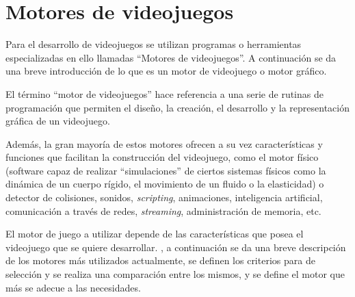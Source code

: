 \section{Motores de videojuegos}



Para el desarrollo de videojuegos se utilizan programas o herramientas
especializadas en ello llamadas \enquote{Motores de videojuegos}. A continuación
se da una breve introducción de lo que es un motor de videojuego o motor
gráfico.

El término \enquote{motor de videojuegos} hace referencia a una serie de rutinas
de programación que permiten el diseño, la creación, el desarrollo y la
representación gráfica de un videojuego\cite{videojuego:telechea}.

Además, la gran mayoría de estos motores ofrecen a su vez características y
funciones que facilitan la construcción del videojuego, como el motor físico
(software capaz de realizar \enquote{simulaciones} de ciertos sistemas físicos
como la dinámica de un cuerpo rígido, el movimiento de un fluido o la
elasticidad) o detector de colisiones, sonidos, \textit{scripting}, animaciones,
inteligencia artificial, comunicación a través de redes, \textit{streaming},
administración de memoria, etc\cite{videojuego:telechea}.

El motor de juego a utilizar depende de las características que posea el
videojuego que se quiere desarrollar. , a continuación
se da una breve descripción de los motores más utilizados actualmente, se
definen los criterios para de selección y se realiza una comparación entre los
mismos, y se define el motor que más se adecue a las necesidades.


